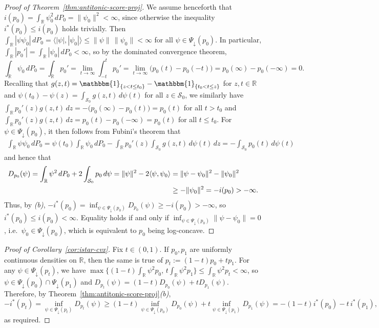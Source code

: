 \documentclass[a4paper]{article}
\newcommand{\R}{\mathbb{R}}
\newcommand{\Ind}{\mathbbm{1}}
\newcommand{\norm}[1]{\|{#1}\|}
\newcommand{\ipr}[2]{\langle #1, #2 \rangle}
\theoremstyle{definition}
\begin{document}
\begin{proof}[Proof of Theorem~\ref{thm:antitonic-score-proj}]
We assume henceforth that $i(p_0) = \int_\R\psi_0^2\,dP_0 = \norm{\psi_0}^2 < \infty$, since otherwise the inequality $i^*(p_0) \leq i(p_0)$ holds trivially. Then $\int_\R|\psi\psi_0|\,dP_0 = \ipr{|\psi|}{|\psi_0|} \leq \norm{\psi}\,\norm{\psi_0} < \infty$ for all $\psi \in \Psi_\downarrow(p_0)$. In particular, $\int_\R|p_0'| = \int_\R|\psi_0|\,dP_0 < \infty$, so by the dominated convergence theorem, 
\[
\int_\R\psi_0\,dP_0 = \int_\R p_0' = \lim_{t \to \infty}\int_{-t}^t p_0' = \lim_{t \to \infty}\bigl(p_0(t) - p_0(-t)\bigr) = p_0(\infty) - p_0(-\infty) = 0.
\]
Recalling that $g(z,t) = \Ind_{\{z < t \leq t_0\}} - \Ind_{\{t_0 < t \leq z\}}$ for $z,t \in \R$ and $\psi(t_0) - \psi(z) = \int_{\mathcal{S}_0} g(z,t)\,d\psi(t)$ for all $z \in \mathcal{S}_0$, we similarly have $\int_\R p_0'(z)g(z,t)\,dz = -\bigl(p_0(\infty) - p_0(t)\bigr) = p_0(t)$ for all $t > t_0$ and $\int_\R p_0'(z)g(z,t)\,dz = p_0(t) - p_0(-\infty) = p_0(t)$ for all $t \leq t_0$. For $\psi \in \Psi_\downarrow(p_0)$, it then follows from Fubini's theorem that
\begin{align*}
\int_\R\psi\psi_0\,dP_0 = \psi(t_0)\int_\R\psi_0\,dP_0 - \int_\R p_0'(z)\int_{\mathcal{S}_0}g(z,t)\,d\psi(t)\,dz = -\int_{\mathcal{S}_0} p_0(t)\,d\psi(t)
\end{align*}
and hence that
\begin{align}
\label{eq:Dp0-psi0}
D_{p_0}(\psi) = \int_\R\psi^2\,dP_0 + 2\int_{\mathcal{S}_0} p_0\,d\psi = \norm{\psi}^2 - 2\ipr{\psi}{\psi_0} &= \norm{\psi - \psi_0}^2 - \norm{\psi_0}^2 \\
&\geq -\norm{\psi_0}^2 = -i(p_0) > -\infty. \notag
\end{align}
Thus, by \emph{(b)}, $-i^*(p_0) = \inf_{\psi \in \Psi_\downarrow(p_0)}D_{p_0}(\psi) \geq -i(p_0) > -\infty$, so $i^*(p_0) \leq i(p_0) < \infty$. Equality holds if and only if $\inf_{\psi \in \Psi_\downarrow(p_0)}\norm{\psi - \psi_0} = 0$, i.e.\ $\psi_0 \in \Psi_\downarrow(p_0)$, which is equivalent to $p_0$ being log-concave.
\end{proof}

\begin{proof}[Proof of Corollary~\ref{cor:istar-cvx}]
Fix $t \in (0,1)$. If $p_0,p_1$ are uniformly continuous densities on $\R$, then the same is true of $p_t := (1 - t)p_0 + tp_1$. For any $\psi \in \Psi_\downarrow(p_t)$, we have $\max\bigl\{(1 - t)\int_\R \psi^2 p_0,\,t\int_\R \psi^2 p_1\bigr\} \leq \int_\R \psi^2 p_t < \infty$, so $\psi \in \Psi_\downarrow(p_0) \cap \Psi_\downarrow(p_1)$ and $D_{p_t}(\psi) = (1 - t)D_{p_0}(\psi) + tD_{p_1}(\psi)$. Therefore, by Theorem~\ref{thm:antitonic-score-proj}\emph{(b)},
\[
-i^*(p_t) = \inf_{\psi \in \Psi_\downarrow(p_t)} D_{p_t}(\psi) \geq (1 - t)\inf_{\psi \in \Psi_\downarrow(p_0)} D_{p_0}(\psi) + t\inf_{\psi \in \Psi_\downarrow(p_1)} D_{p_1}(\psi) = -(1 - t)i^*(p_0) - t\,i^*(p_1),
\]
as required.
\end{proof}
\end{document}
